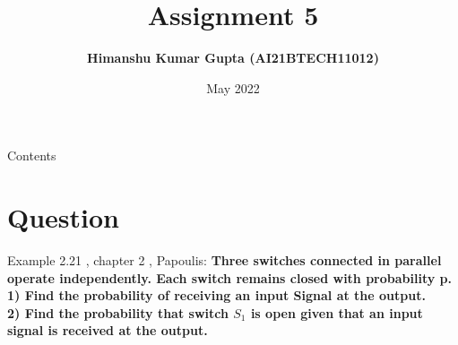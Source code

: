 \documentclass{beamer}
\title{Assignment 5}
\author{\textbf{Himanshu Kumar Gupta (AI21BTECH11012)}}
\date {May 2022}
\begin{document}
\newcommand{\myvec}[1]{\ensuremath{\begin{pmatrix}#1\end{pmatrix}}}
\let\vec\mathbf

\begin{frame}
    \titlepage
\end{frame}
\begin{frame}{Contents}
\tableofcontents
\end{frame}

\section{Question}
\begin{frame}{Example 2.21 , chapter 2 , Papoulis:}
 \textbf{   
Three switches connected in parallel operate independently. Each switch remains closed with probability p.\\
1) Find the probability of receiving an input Signal at the output.\\
2) Find the probability that switch $S_1$ is open given that an input signal is received at the output.}
\end{frame}
\end{document}
